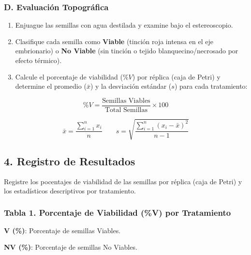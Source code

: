 \documentclass[
  spanish,
  10pt,
  letterpaper,
  twocolumn]{article}
\providecommand{\tightlist}{%
  \setlength{\itemsep}{0pt}\setlength{\parskip}{0pt}}
\begin{document}
\subsubsection{D. Evaluación
Topográfica}\label{d.-evaluaciuxf3n-topogruxe1fica}

\begin{enumerate}
\def\labelenumi{\arabic{enumi}.}
\tightlist
\item
  Enjuague las semillas con agua destilada y examine bajo el
  estereoscopio.
\item
  Clasifique cada semilla como \textbf{Viable} (tinción roja intensa en
  el eje embrionario) o \textbf{No Viable} (sin tinción o tejido
  blanquecino/necrosado por efecto térmico).
\item
  Calcule el porcentaje de viabilidad (\(\%V\)) por réplica (caja de
  Petri) y determine el promedio (\(\bar{x}\)) y la desviación estándar
  (\(s\)) para cada tratamiento:
\end{enumerate}

\[\%V = \frac{\text{Semillas Viables}}{\text{Total Semillas}} \times 100\]

\[\bar{x} = \frac{\sum_{i=1}^{n} x_i}{n} \qquad s = \sqrt{\frac{\sum_{i=1}^{n} (x_i - \bar{x})^2}{n - 1}}\]

\subsection{4. Registro de Resultados}\label{registro-de-resultados}

Registre los pocentajes de viabilidad de las semillas por réplica (caja
de Petri) y los estadísticos descriptivos por tratamiento.

\subsubsection{Tabla 1. Porcentaje de Viabilidad (\%V) por
Tratamiento}\label{tabla-1.-porcentaje-de-viabilidad-v-por-tratamiento}

\textbf{V (\%)}: Porcentaje de semillas Viables.

\textbf{NV (\%)}: Porcentaje de semillas No Viables.

\begin{center}
\end{center}
\end{document}
